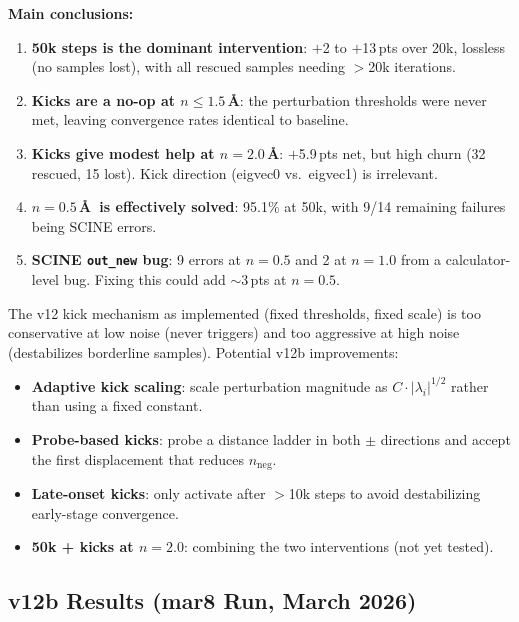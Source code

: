 \documentclass[11pt,a4paper]{article}
\theoremstyle{definition}
\begin{document}
\textbf{Main conclusions:}
\begin{enumerate}[nosep]
  \item \textbf{50k steps is the dominant intervention}: $+$2 to $+$13\,pts
    over 20k, lossless (no samples lost), with all rescued samples needing
    $>$20k iterations.
  \item \textbf{Kicks are a no-op at $n \leq 1.5$\,\AA}: the perturbation
    thresholds were never met, leaving convergence rates identical to
    baseline.
  \item \textbf{Kicks give modest help at $n=2.0$\,\AA}: $+$5.9\,pts net,
    but high churn (32 rescued, 15 lost).  Kick direction (eigvec0 vs.\
    eigvec1) is irrelevant.
  \item \textbf{$n=0.5$\,\AA\ is effectively solved}: 95.1\% at 50k, with
    9/14 remaining failures being SCINE errors.
  \item \textbf{SCINE \texttt{out\_new} bug}: 9 errors at $n=0.5$ and 2 at
    $n=1.0$ from a calculator-level bug.  Fixing this could add $\sim$3\,pts
    at $n=0.5$.
\end{enumerate}

The v12 kick mechanism as implemented (fixed thresholds, fixed scale) is
too conservative at low noise (never triggers) and too aggressive at high
noise (destabilizes borderline samples).  Potential v12b improvements:
\begin{itemize}[nosep]
  \item \textbf{Adaptive kick scaling}: scale perturbation magnitude as
    $C \cdot |\lambda_i|^{1/2}$ rather than using a fixed constant.
  \item \textbf{Probe-based kicks}: probe a distance ladder in both $\pm$
    directions and accept the first displacement that reduces $n_\text{neg}$.
  \item \textbf{Late-onset kicks}: only activate after $>$10k steps to avoid
    destabilizing early-stage convergence.
  \item \textbf{50k + kicks at $n=2.0$}: combining the two interventions
    (not yet tested).
\end{itemize}

\subsection{v12b Results (mar8 Run, March 2026)}
\label{sec:v12b}
\end{document}
